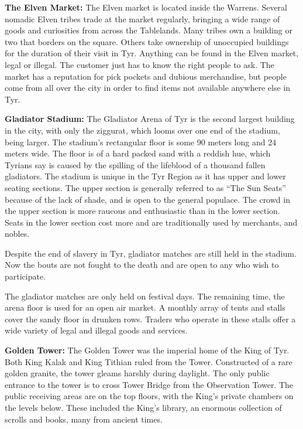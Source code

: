 {
	\textbf{The Elven Market:} The Elven market is located inside the Warrens. Several nomadic Elven tribes trade at the market regularly, bringing a wide range of goods and curiosities from across the Tablelands. Many tribes own a building or two that borders on the square. Others take ownership of unoccupied buildings for the duration of their visit in Tyr. Anything can be found in the Elven market, legal or illegal. The customer just has to know the right people to ask. The market has a reputation for pick pockets and dubious merchandise, but people come from all over the city in order to find items not available anywhere else in Tyr.

	\textbf{Gladiator Stadium:} The Gladiator Arena of Tyr is the second largest building in the city, with only the ziggurat, which looms over one end of the stadium, being larger. The stadium's rectangular floor is some 90 meters long and 24 meters wide. The floor is of a hard packed sand with a reddish hue, which Tyrians say is caused by the spilling of the lifeblood of a thousand fallen gladiators. The stadium is unique in the Tyr Region as it has upper and lower seating sections. The upper section is generally referred to as ``The Sun Seats'' because of the lack of shade, and is open to the general populace. The crowd in the upper section is more raucous and enthusiastic than in the lower section. Seats in the lower section cost more and are traditionally used by merchants, and nobles.

	Despite the end of slavery in Tyr, gladiator matches are still held in the stadium. Now the bouts are not fought to the death and are open to any who wish to participate.

	The gladiator matches are only held on festival days. The remaining time, the arena floor is used for an open air market. A monthly array of tents and stalls cover the sandy floor in drunken rows. Traders who operate in these stalls offer a wide variety of legal and illegal goods and services.

	\textbf{Golden Tower:} The Golden Tower was the imperial home of the King of Tyr. Both King Kalak and King Tithian ruled from the Tower. Constructed of a rare golden granite, the tower gleams harshly during daylight. The only public entrance to the tower is to cross Tower Bridge from the Observation Tower. The public receiving areas are on the top floors, with the King's private chambers on the levels below. These included the King's library, an enormous collection of scrolls and books, many from ancient times.

}
